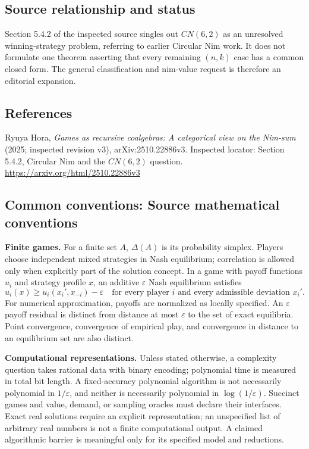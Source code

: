 \documentclass[11pt,a4paper]{article}
\begin{document}
\subsection*{Source relationship and status}
Section 5.4.2 of the inspected source singles out $CN(6,2)$ as an unresolved winning-strategy problem, referring to earlier Circular Nim work. It does not formulate one theorem asserting that every remaining $(n,k)$ case has a common closed form. The general classification and nim-value request is therefore an editorial expansion.

\subsection*{References}
\begingroup\footnotesize\raggedright
\noindent [S1] Ryuya Hora, \emph{Games as recursive coalgebras: A categorical view on the Nim-sum} (2025; inspected revision v3), arXiv:2510.22886v3. Inspected locator: Section 5.4.2, Circular Nim and the $CN(6,2)$ question.
\url{https://arxiv.org/html/2510.22886v3}
\par\endgroup

\subsection*{Common conventions: Source mathematical conventions}

\textbf{Finite games.} For a finite set $A$, $\Delta(A)$ is its probability
simplex. Players choose independent mixed strategies in Nash equilibrium;
correlation is allowed only when explicitly part of the solution concept.
In a game with payoff functions $u_i$ and strategy profile $x$, an additive
$\varepsilon$ Nash equilibrium satisfies
\[
 u_i(x)\geq u_i(x_i',x_{-i})-\varepsilon
 \quad\text{for every player $i$ and every admissible deviation $x_i'$}.
\]
For numerical approximation, payoffs are normalized as locally specified.
An $\varepsilon$ payoff residual is distinct from distance at most
$\varepsilon$ to the set of exact equilibria. Point convergence, convergence
of empirical play, and convergence in distance to an equilibrium set are
also distinct.

\textbf{Computational representations.} Unless stated otherwise, a complexity
question takes rational data with binary encoding; polynomial time is measured
in total bit length. A fixed-accuracy polynomial algorithm is not necessarily
polynomial in $1/\varepsilon$, and neither is necessarily polynomial in
$\log(1/\varepsilon)$. Succinct games and value, demand, or sampling oracles
must declare their interfaces. Exact real solutions require an explicit
representation; an unspecified list of arbitrary real numbers is not a
finite computational output. A claimed algorithmic barrier is meaningful
only for its specified model and reductions.
\end{document}
